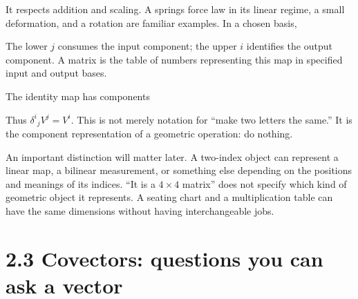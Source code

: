 \documentclass[
  11pt,
  letterpaper,
  oneside,
  openany]{scrbook}
\begin{document}
\begin{center}
\begingroup
{}
\ifdim\wd\grmathbox>\linewidth
\resizebox{\linewidth}{!}{\usebox{\grmathbox}}
\else\usebox{\grmathbox}\fi
\endgroup
\end{center}

It respects addition and scaling. A spring\textquotesingle s force law
in its linear regime, a small deformation, and a rotation are familiar
examples. In a chosen basis,

\begin{center}
\begingroup
{}
\ifdim\wd\grmathbox>\linewidth
\resizebox{\linewidth}{!}{\usebox{\grmathbox}}
\else\usebox{\grmathbox}\fi
\endgroup
\end{center}

The lower \(j\) consumes the input component; the upper \(i\) identifies
the output component. A matrix is the table of numbers representing this
map in specified input and output bases.

The identity map has components

\begin{center}
\begingroup
{}
\ifdim\wd\grmathbox>\linewidth
\resizebox{\linewidth}{!}{\usebox{\grmathbox}}
\else\usebox{\grmathbox}\fi
\endgroup
\end{center}

Thus \(\delta^i{}_jV^j=V^i\). This is not merely notation for ``make two
letters the same.'' It is the component representation of a geometric
operation: do nothing.

An important distinction will matter later. A two-index object can
represent a linear map, a bilinear measurement, or something else
depending on the positions and meanings of its indices. ``It is a
\(4\times4\) matrix'' does not specify which kind of geometric object it
represents. A seating chart and a multiplication table can have the same
dimensions without having interchangeable jobs.

\hypertarget{covectors-questions-you-can-ask-a-vector}{%
\section{2.3 Covectors: questions you can ask a
vector}\label{covectors-questions-you-can-ask-a-vector}}
\end{document}
